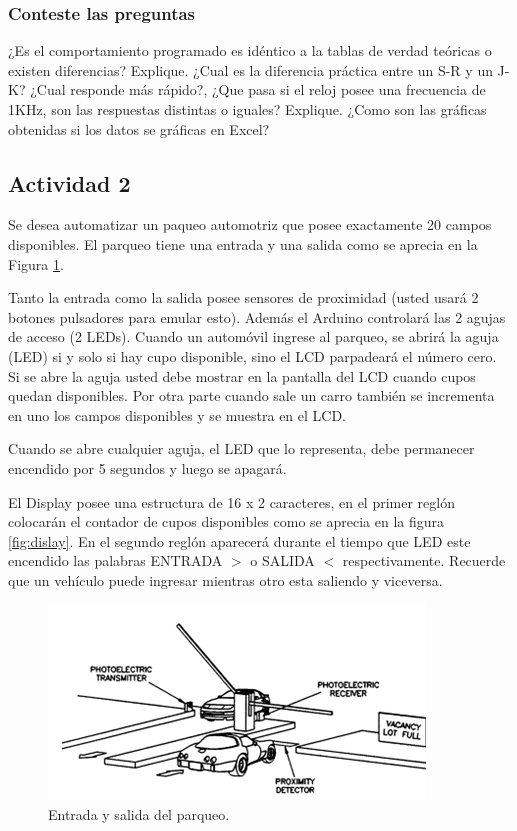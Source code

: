 \subsubsection{Conteste las preguntas}

¿Es el comportamiento programado es idéntico a la tablas de verdad teóricas o existen diferencias? Explique.
¿Cual es la diferencia práctica entre un S-R y un J-K? ¿Cual responde más rápido?,
¿Que pasa si el reloj posee una frecuencia de 1KHz, son las respuestas distintas o iguales? Explique. 
¿Como son las gráficas obtenidas si los datos se gráficas en Excel?

\subsection{Actividad 2}

Se desea automatizar un paqueo automotriz que posee exactamente 20 campos disponibles. El parqueo tiene una entrada y una salida como se aprecia en la Figura \ref{fig:parqueo}. 

Tanto la entrada como la salida posee sensores de proximidad (usted usará 2 botones pulsadores para emular  esto). Además el Arduino controlará las 2 agujas de acceso (2 LEDs). Cuando un automóvil ingrese al parqueo, se abrirá la aguja (LED) si y solo si hay cupo disponible, sino el LCD parpadeará el número cero. Si se abre la aguja usted debe mostrar en la pantalla del LCD cuando cupos quedan disponibles. Por otra parte cuando sale un carro también se incrementa en uno los campos disponibles y se muestra en el LCD.

Cuando se abre cualquier aguja, el LED que lo representa, debe permanecer encendido por 5 segundos y luego se apagará.

El Display posee una estructura de 16 x 2 caracteres, en el primer reglón colocarán el contador de cupos disponibles como se aprecia en la figura \ref{fig:dislay}. En el segundo reglón aparecerá durante el tiempo que LED  este encendido las palabras ENTRADA $>$ o SALIDA $<$  respectivamente. Recuerde que un vehículo puede ingresar mientras otro esta saliendo y viceversa.

\begin{figure}
	\centering
	\includegraphics[width=0.7\linewidth]{Imagenes/Parqueo}
	\caption{Entrada y salida del parqueo.}
	\label{fig:parqueo}
\end{figure}

